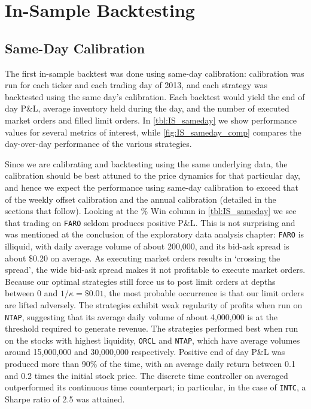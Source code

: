 \FloatBarrier
\section{In-Sample Backtesting}

\subsection{Same-Day Calibration}
The first in-sample backtest was done using same-day calibration: calibration was run for each ticker and each trading day of 2013, and each strategy was backtested using the same day's calibration. Each backtest would yield the end of day P\&L, average inventory held during the day, and the number of executed market orders and filled limit orders. In \autoref{tbl:IS_sameday} we show performance values for several metrics of interest, while \autoref{fig:IS_sameday_comp} compares the day-over-day performance of the various strategies. 

Since we are calibrating and backtesting using the same underlying data, the calibration should be best attuned to the price dynamics for that particular day, and hence we expect the performance using same-day calibration to exceed that of the weekly offset calibration and the annual calibration (detailed in the sections that follow). Looking at the \% Win column in \autoref{tbl:IS_sameday} we see that trading on \texttt{FARO} seldom produces positive P\&L. This is not surprising and was mentioned at the conclusion of the exploratory data analysis chapter: \texttt{FARO} is illiquid, with daily average volume of about 200,000, and its bid-ask spread is about \$0.20 on average. As executing market orders results in `crossing the spread', the wide bid-ask spread makes it not profitable to execute market orders. Because our optimal strategies still force us to post limit orders at depths between 0 and $1/\kappa = \$0.01$, the most probable occurrence is that our limit orders are lifted adversely. The strategies exhibit weak regularity of profits when run on \texttt{NTAP}, suggesting that its average daily volume of about 4,000,000 is at the threshold required to generate revenue. The strategies performed best when run on the stocks with highest liquidity, \texttt{ORCL} and \texttt{NTAP}, which have average volumes around 15,000,000 and 30,000,000 respectively. Positive end of day P\&L was produced more than 90\% of the time, with an average daily return between 0.1 and 0.2 times the initial stock price. The discrete time controller on averaged outperformed its continuous time counterpart; in particular, in the case of \texttt{INTC}, a Sharpe ratio of 2.5 was attained.

